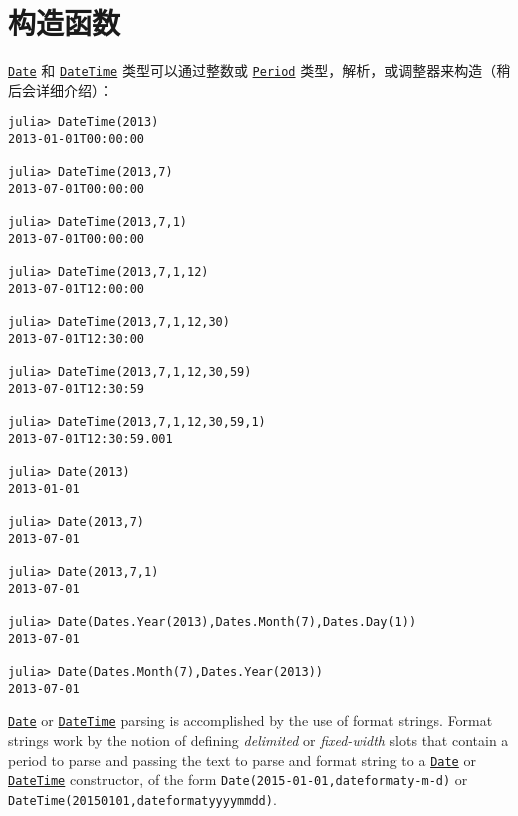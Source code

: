 \hypertarget{5490460475085720426}{}


\section{构造函数}



\hyperlink{4488183467971164548}{\texttt{Date}} 和 \hyperlink{17572689933274889838}{\texttt{DateTime}} 类型可以通过整数或 \hyperlink{17624028548543163266}{\texttt{Period}} 类型，解析，或调整器来构造（稍后会详细介绍）：




\begin{verbatim}
julia> DateTime(2013)
2013-01-01T00:00:00

julia> DateTime(2013,7)
2013-07-01T00:00:00

julia> DateTime(2013,7,1)
2013-07-01T00:00:00

julia> DateTime(2013,7,1,12)
2013-07-01T12:00:00

julia> DateTime(2013,7,1,12,30)
2013-07-01T12:30:00

julia> DateTime(2013,7,1,12,30,59)
2013-07-01T12:30:59

julia> DateTime(2013,7,1,12,30,59,1)
2013-07-01T12:30:59.001

julia> Date(2013)
2013-01-01

julia> Date(2013,7)
2013-07-01

julia> Date(2013,7,1)
2013-07-01

julia> Date(Dates.Year(2013),Dates.Month(7),Dates.Day(1))
2013-07-01

julia> Date(Dates.Month(7),Dates.Year(2013))
2013-07-01
\end{verbatim}



\hyperlink{4488183467971164548}{\texttt{Date}} or \hyperlink{17572689933274889838}{\texttt{DateTime}} parsing is accomplished by the use of format strings. Format strings work by the notion of defining \emph{delimited} or \emph{fixed-width} {\textquotedbl}slots{\textquotedbl} that contain a period to parse and passing the text to parse and format string to a \hyperlink{4488183467971164548}{\texttt{Date}} or \hyperlink{17572689933274889838}{\texttt{DateTime}} constructor, of the form \texttt{Date({\textquotedbl}2015-01-01{\textquotedbl},dateformat{\textquotedbl}y-m-d{\textquotedbl})} or \texttt{DateTime({\textquotedbl}20150101{\textquotedbl},dateformat{\textquotedbl}yyyymmdd{\textquotedbl})}.



